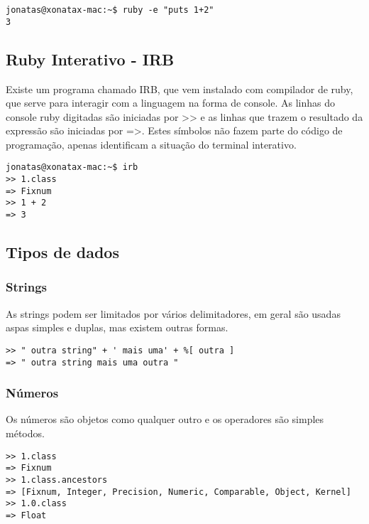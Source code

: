 \documentclass[12pt]{article}
\begin{document}
\begin{lstlisting}[caption=Usando o compilador na linha de comando]
jonatas@xonatax-mac:~$ ruby -e "puts 1+2"
3
\end{lstlisting}

\subsection { Ruby Interativo - IRB }

Existe um programa chamado IRB, que vem instalado com compilador de ruby, que serve para interagir com a linguagem na forma de console. As linhas do console ruby digitadas são iniciadas por >> e as linhas que trazem o resultado da expressão são iniciadas por =>. Estes símbolos não fazem parte do código de programação, apenas identificam a situação do terminal interativo.

\begin{lstlisting}[caption=Usando o compilador na linha de comando]
jonatas@xonatax-mac:~$ irb
>> 1.class
=> Fixnum
>> 1 + 2
=> 3
\end{lstlisting}

\subsection { Tipos de dados }

\subsubsection { Strings }

As strings podem ser limitados por vários delimitadores, em geral são usadas aspas simples e duplas, mas existem outras formas.

\begin{lstlisting}[caption=Exemplos de uso de string]
>> " outra string" + ' mais uma' + %[ outra ]
=> " outra string mais uma outra "
\end{lstlisting}

\subsubsection { Números }

Os números são objetos como qualquer outro e os operadores são simples métodos.

\begin{lstlisting}[caption=Exemplos de uso de números ]
>> 1.class
=> Fixnum
>> 1.class.ancestors
=> [Fixnum, Integer, Precision, Numeric, Comparable, Object, Kernel]
>> 1.0.class
=> Float
\end{lstlisting}
\end{document}
